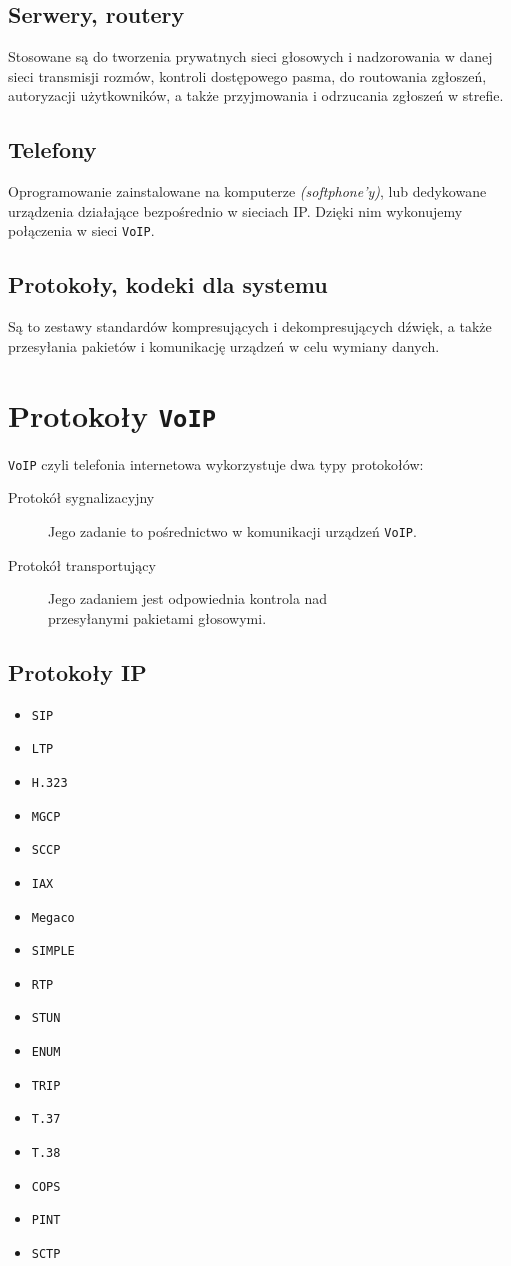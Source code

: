 \documentclass[a4paper]{article}
\begin{document}
\subsection{Serwery, routery}
Stosowane są do tworzenia prywatnych sieci głosowych i nadzorowania w danej sieci transmisji
rozmów, kontroli dostępowego pasma, do routowania zgłoszeń, autoryzacji
użytkowników, a także przyjmowania i odrzucania zgłoszeń w strefie.
\subsection{Telefony}
Oprogramowanie zainstalowane na komputerze \emph{(softphone'y)},
lub dedykowane urządzenia działające bezpośrednio w sieciach IP.
Dzięki nim wykonujemy połączenia w sieci {\tt VoIP}.
\subsection{Protokoły, kodeki dla systemu}
Są to zestawy standardów kompresujących i dekompresujących dźwięk,
a także przesyłania pakietów i komunikację urządzeń w celu wymiany danych.
\section{Protokoły {\tt VoIP}}
{\tt VoIP} czyli telefonia internetowa wykorzystuje dwa typy protokołów:
\begin{description}
    \item[Protokół sygnalizacyjny] Jego zadanie to pośrednictwo w komunikacji urządzeń {\tt VoIP}.
    \item[Protokół transportujący] Jego zadaniem jest odpowiednia kontrola nad \\
    przesyłanymi pakietami głosowymi.
\end{description}
\pagebreak
\subsection{Protokoły IP}
\begin{itemize}
    \item {\tt SIP}
    \item {\tt LTP}
    \item {\tt H.323}
    \item {\tt MGCP}
    \item {\tt SCCP}
    \item {\tt IAX}
    \item {\tt Megaco}
    \item {\tt SIMPLE}
    \item {\tt RTP}
    \item {\tt STUN}
    \item {\tt ENUM}
    \item {\tt TRIP}
    \item {\tt T.37}
    \item {\tt T.38}
    \item {\tt COPS}
    \item {\tt PINT}
    \item {\tt SCTP}
\end{itemize}
\pagebreak
\end{document}

